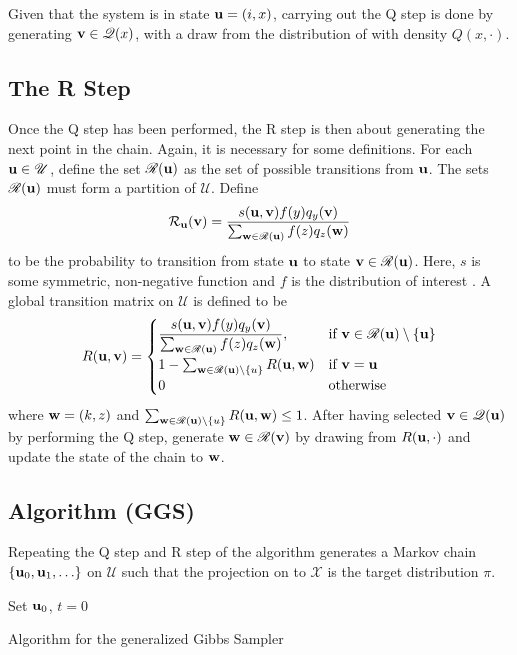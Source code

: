 Given that the system is in state $\mathbf{u} = (i,x)$, carrying out the Q step is done by generating $\mathbf{v} \in \mathscr Q(x)$, with a draw from the distribution of with density $Q(x,\cdot)$.

\subsection{The R Step}
Once the Q step has been performed, the R step is then about generating the next point in the chain. Again, it is necessary for some definitions.
For each $\mathbf{u} \in \mathscr U$, define the set $\mathscr R(\mathbf{u})$ as the set of possible transitions from $\mathbf{u}$. The sets $\mathscr R(\mathbf{u})$ must form a partition of ${\mathscr U}$. 
Define $$\mathcal R_{\mathbf{u}}(\mathbf{v}) = \frac{s(\mathbf{u},\mathbf{v})f(y)q_y(\mathbf{v})}{\sum_{\mathbf{w}\in\mathscr R(\mathbf{u})}f(z)q_z(\mathbf{w})}$$ to be the probability to transition from state $\mathbf{u}$ to state $\mathbf{v}\in\mathscr R(\mathbf{u})$. Here, $s$ is some symmetric, non-negative function and $f$ is the distribution of interest {\color{red}{should I change this to $\pi$ or change the others to $f$?}}. 
A global transition matrix on ${\mathscr U}$ is defined to be
\begin{equation}
		R(\mathbf{u},\mathbf{v}) = 
			\begin{cases}
			\dfrac{s(\mathbf{u},\mathbf{v})f(y)q_y(\mathbf{v})}{\sum_{\mathbf{w}\in\mathscr R(\mathbf{u})}f(z)q_z(\mathbf{w})}, & \text{if } \mathbf{v} \in \mathscr R(\mathbf{u})\setminus\{\mathbf{u}\}\\
			1 - \sum_{\mathbf{w} \in \mathscr R(\mathbf{u})\setminus\mathbf{\{}u\}} R(\mathbf{u},\mathbf{w}) & 
		    \text{if $\mathbf{v} = \mathbf{u}$}\\
			0 & \text{otherwise}\end{cases}
		\end{equation}
	where $\mathbf{w} = (k,z)$ and $\sum_{\mathbf{w} \in \mathscr R(\mathbf{u})\setminus\mathbf{\{}u\}} R(\mathbf{u},\mathbf{w}) \leq 1$.
After having selected $\mathbf{v} \in \mathscr Q(\mathbf{u})$ by performing the Q step, generate $\mathbf{w} \in \mathscr R(\mathbf{v})$ by drawing from $R(\mathbf{u},\cdot)$ and update the state of the chain to $\mathbf{w}$.
\subsection{Algorithm (GGS)}
Repeating the Q step and R step of the algorithm generates a Markov chain $\{\mathbf{u}_0,\mathbf{u}_1,\ldots\}$ on $\mathscr U$ such that the projection on to $\mathscr X$ is the target distribution $\pi$.

\begin{algorithm}[H]
 Set $\mathbf{u}_0$, $t=0$\; 
  \caption{Algorithm for the generalized Gibbs Sampler}
\end{algorithm}